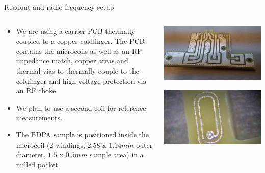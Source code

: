 \documentclass[final]{beamer}
\begin{document}
\begin{frame}[fragile]{}
\begin{columns}[T]
\begin{column}{.49\linewidth}
      \begin{block}{\large Readout and radio frequency setup}
        \begin{columns}
          \begin{column}{0.6\columnwidth}
            \begin{itemize}
              \item We are using a carrier PCB thermally coupled to a copper coldfinger.
                    The PCB contains the microcoils as well as an RF impedance match,
                    copper areas and thermal vias to thermally couple to the coldfinger
                    and high voltage protection via an RF choke.
              \item We plan to use a second coil for reference measurements.
              \item The BDPA sample is positioned inside the microcoil (2 windings, $2.58$ x $1.14mm$
                    outer diameter, $1.5$ x $0.5mm$ sample area) in a milled pocket.
            \end{itemize}
          \end{column}
          \begin{column}{0.4\columnwidth}
            \includegraphics[width=\columnwidth]{figures/pcb01.jpg}

            \includegraphics[width=\columnwidth]{figures/pcb02.jpg}
          \end{column}
        \end{columns}


\end{block}
\end{column}
\end{columns}
\end{frame}
\end{document}
